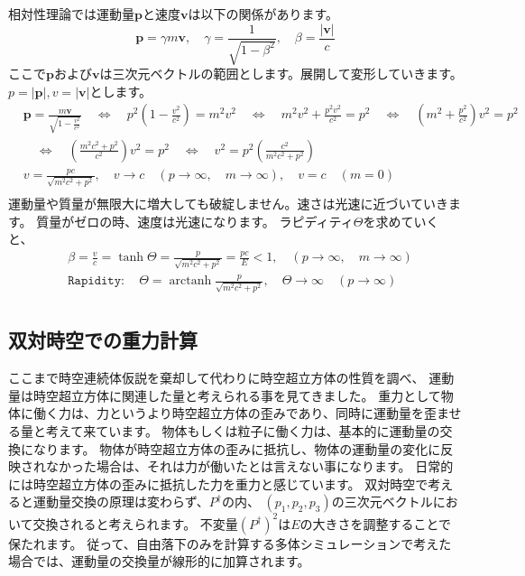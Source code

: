 \documentclass[a4paper,12pt,notitlepage]{jsreport}
\DeclareMathOperator\arctanh{arctanh}
\begin{document}
相対性理論では運動量$\bm{p}$と速度$\bm{v}$は以下の関係があります。
\begin{equation}
  \bm{p}=\gamma m\bm{v}, \quad \gamma=\frac{1}{\sqrt{1-\beta^2}}, \quad \beta=\frac{|\bm{v}|}{c}
\end{equation}
ここで$\bm{p}$および$\bm{v}$は三次元ベクトルの範囲とします。展開して変形していきます。
$p=|\bm{p}|, v=|\bm{v}|$とします。
\begin{equation}
  \begin{split}
    &\bm{p} = \frac{m \bm{v}}{\sqrt{1 - \frac{v^2}{c^2}}} \quad \Leftrightarrow \quad
    p^2(1 - \frac{v^2}{c^2}) = m^2 v^2 \quad \Leftrightarrow \quad
    m^2 v^2 + \frac{p^2 v^2}{c^2} = p^2 \quad \Leftrightarrow \quad
    (m^2 + \frac{p^2}{c^2}) v^2 = p^2\\
    &\quad \Leftrightarrow \quad (\frac{m^2 c^2 + p^2}{c^2}) v^2 = p^2 \quad \Leftrightarrow \quad
    v^2 = p^2(\frac{c^2}{m^2 c^2 + p^2})\\
    &v = \frac{pc}{\sqrt{m^2 c^2 + p^2}}, \quad v \to c \quad (p \to \infty, \quad m \to \infty),
    \quad v = c \quad (m = 0)\\
  \end{split}
\end{equation}
運動量や質量が無限大に増大しても破綻しません。速さは光速に近づいていきます。
質量がゼロの時、速度は光速になります。
ラピディティ$ \Theta $を求めていくと、
\begin{equation}
  \begin{split}
    &\beta = \frac{v}{c} = \tanh \Theta = \frac{p}{\sqrt{m^2 c^2 + p^2}} = \frac{pc}{E} < 1
    , \quad (p \to \infty, \quad m \to \infty)\\
    &\texttt{Rapidity}: \quad \Theta = \arctanh \frac{p}{\sqrt{m^2 c^2 + p^2}}
    , \quad \Theta \to \infty \quad (p \to \infty)\\
  \end{split}
\end{equation}

\subsection{双対時空での重力計算}

ここまで時空連続体仮説を棄却して代わりに時空超立方体の性質を調べ、
運動量は時空超立方体に関連した量と考えられる事を見てきました。
重力として物体に働く力は、力というより時空超立方体の歪みであり、同時に運動量を歪ませる量と考えて来ています。
物体もしくは粒子に働く力は、基本的に運動量の交換になります。
物体が時空超立方体の歪みに抵抗し、物体の運動量の変化に反映されなかった場合は、それは力が働いたとは言えない事になります。
日常的には時空超立方体の歪みに抵抗した力を重力と感じています。
双対時空で考えると運動量交換の原理は変わらず、$ P^\dag $の内、
$ (p_1, p_2, p_3) $の三次元ベクトルにおいて交換されると考えられます。
不変量$ (P^\dag)^2 $は$ E $の大きさを調整することで保たれます。
従って、自由落下のみを計算する多体シミュレーションで考えた場合では、運動量の交換量が線形的に加算されます。
\end{document}
